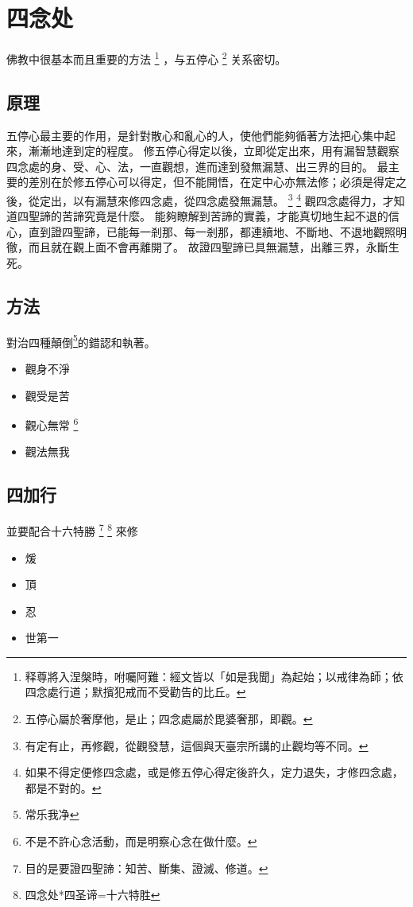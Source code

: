 \section{四念处}
佛教中很基本而且重要的方法
\footnote{释尊將入涅槃時，咐囑阿難：經文皆以「如是我聞」為起始；以戒律為師；依四念處行道；默擯犯戒而不受勸告的比丘。}
，与五停心
\footnote{五停心屬於奢摩他，是止；四念處屬於毘婆奢那，即觀。}
关系密切。

\subsection{原理}
五停心最主要的作用，是針對散心和亂心的人，使他們能夠循著方法把心集中起來，漸漸地達到定的程度。
修五停心得定以後，立即從定出來，用有漏智慧觀察四念處的身、受、心、法，一直觀想，進而達到發無漏慧、出三界的目的。
最主要的差別在於修五停心可以得定，但不能開悟，在定中心亦無法修；必須是得定之後，從定出，以有漏慧來修四念處，從四念處發無漏慧。
\footnote{有定有止，再修觀，從觀發慧，這個與天臺宗所講的止觀均等不同。}
\footnote{如果不得定便修四念處，或是修五停心得定後許久，定力退失，才修四念處，都是不對的。}
觀四念處得力，才知道四聖諦的苦諦究竟是什麼。
能夠瞭解到苦諦的實義，才能真切地生起不退的信心，直到證四聖諦，已能每一剎那、每一剎那，都連續地、不斷地、不退地觀照明徹，而且就在觀上面不會再離開了。
故證四聖諦已具無漏慧，出離三界，永斷生死。

\subsection{方法}
對治四種顛倒\footnote{常乐我净}的錯認和執著。
\begin{itemize}
  \item 觀身不淨
  \item 觀受是苦
  \item 觀心無常
    \footnote{不是不許心念活動，而是明察心念在做什麼。}
  \item 觀法無我
\end{itemize}

\subsection{四加行}
並要配合十六特勝
\footnote{目的是要證四聖諦：知苦、斷集、證滅、修道。}
\footnote{四念处*四圣谛=十六特胜}
來修
\begin{itemize}
  \item 煖
  \item 頂
  \item 忍
  \item 世第一
\end{itemize}
